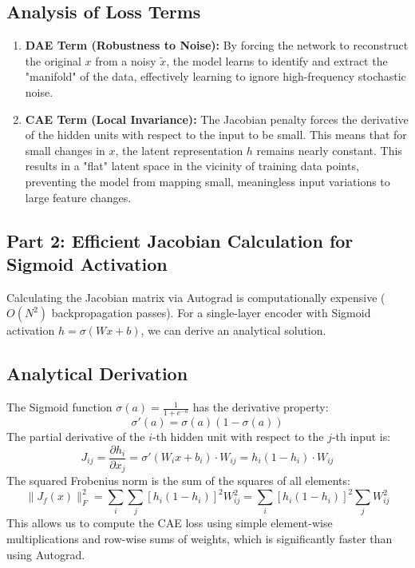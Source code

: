 \documentclass{article}
\begin{document}
\subsection*{Analysis of Loss Terms}
\begin{enumerate}
	\item \textbf{DAE Term (Robustness to Noise):} By forcing the network to reconstruct the original $x$ from a noisy $\tilde{x}$, the model learns to identify and extract the "manifold" of the data, effectively learning to ignore high-frequency stochastic noise.
	\item \textbf{CAE Term (Local Invariance):} The Jacobian penalty forces the derivative of the hidden units with respect to the input to be small. This means that for small changes in $x$, the latent representation $h$ remains nearly constant. This results in a "flat" latent space in the vicinity of training data points, preventing the model from mapping small, meaningless input variations to large feature changes.
\end{enumerate}

\subsection{Part 2: Efficient Jacobian Calculation for Sigmoid Activation}
Calculating the Jacobian matrix via Autograd is computationally expensive ($O(N^2)$ backpropagation passes). For a single-layer encoder with Sigmoid activation $h = \sigma(Wx + b)$, we can derive an analytical solution.

\subsection*{Analytical Derivation}
The Sigmoid function $\sigma(a) = \frac{1}{1+e^{-a}}$ has the derivative property:
\begin{equation}
\sigma'(a) = \sigma(a)(1 - \sigma(a))
\end{equation}
The partial derivative of the $i$-th hidden unit with respect to the $j$-th input is:
\begin{equation}
J_{ij} = \frac{\partial h_i}{\partial x_j} = \sigma'(W_i x + b_i) \cdot W_{ij} = h_i(1 - h_i) \cdot W_{ij}
\end{equation}
The squared Frobenius norm is the sum of the squares of all elements:
\begin{equation}
\|J_f(x)\|_F^2 = \sum_{i} \sum_{j} [h_i(1 - h_i)]^2 W_{ij}^2 = \sum_{i} [h_i(1 - h_i)]^2 \sum_{j} W_{ij}^2
\end{equation}
This allows us to compute the CAE loss using simple element-wise multiplications and row-wise sums of weights, which is significantly faster than using Autograd.
\end{document}

